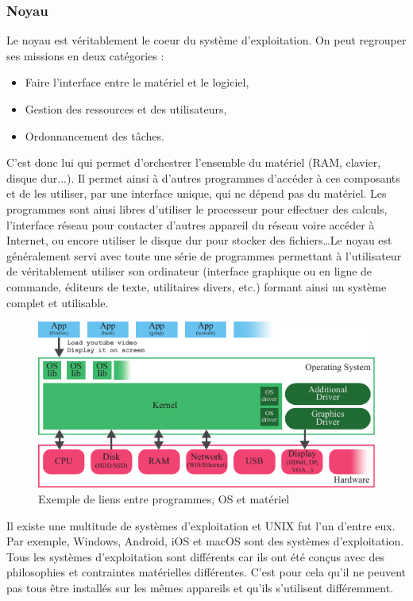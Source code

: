 \subsubsection{Noyau}

Le noyau est véritablement le coeur du système d'exploitation. On peut regrouper ses missions en deux catégories : 
\begin{itemize}
    \item Faire l'interface entre le matériel et le logiciel,
    \item Gestion des ressources et des utilisateurs,
    \item Ordonnancement des tâches.
\end{itemize}

C'est donc lui qui permet d'orchestrer l'ensemble du matériel (RAM, clavier, disque dur...). Il permet ainsi à d'autres programmes d'accéder à ces composants et de les utiliser, par une interface unique, qui ne dépend pas du matériel. Les programmes sont ainsi libres d'utiliser le processeur pour effectuer des calculs, l'interface réseau pour contacter d'autres appareil du réseau voire accéder à Internet, ou encore utiliser le disque dur pour stocker des fichiers\dots Le noyau est généralement servi avec toute une série de programmes permettant à l'utilisateur de véritablement utiliser son ordinateur (interface graphique ou en ligne de commande, éditeurs de texte, utilitaires divers, etc.) formant ainsi un système complet et utilisable.

\begin{figure}[hb!]
\includegraphics[width=\textwidth]{res/os_architecture.pdf}
\centering
\caption{Exemple de liens entre programmes, OS et matériel}
\label{fig:os}
\end{figure}

Il existe une multitude de systèmes d'exploitation et UNIX fut l'un d'entre eux. Par exemple, Windows, Android, iOS et macOS sont des systèmes d'exploitation. Tous les systèmes d'exploitation sont différents car ils ont été conçus avec des philosophies et contraintes matérielles différentes. C'est pour cela qu'il ne peuvent pas tous être installés sur les mêmes appareils et qu'ils s'utilisent différemment.

